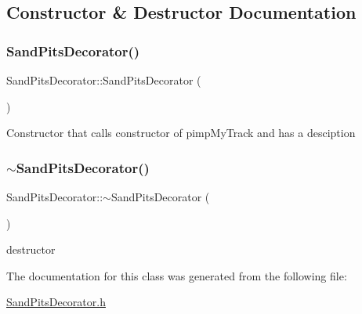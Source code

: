 \subsection{Constructor \& Destructor Documentation}
\mbox{\label{class_sand_pits_decorator_ad4c404c58c44df9c10429f7d76672855}} 
\subsubsection{\texorpdfstring{Sand\+Pits\+Decorator()}{SandPitsDecorator()}}
{\footnotesize\ttfamily Sand\+Pits\+Decorator\+::\+Sand\+Pits\+Decorator (\begin{DoxyParamCaption}{ }\end{DoxyParamCaption})\hspace{0.3cm}{\ttfamily [inline]}}

Constructor that calls constructor of pimp\+My\+Track and has a desciption \mbox{\label{class_sand_pits_decorator_a7b4b725536eaeb7412cb8e12ef0e1dc3}} 
\subsubsection{\texorpdfstring{$\sim$\+Sand\+Pits\+Decorator()}{~SandPitsDecorator()}}
{\footnotesize\ttfamily Sand\+Pits\+Decorator\+::$\sim$\+Sand\+Pits\+Decorator (\begin{DoxyParamCaption}{ }\end{DoxyParamCaption})\hspace{0.3cm}{\ttfamily [inline]}}

destructor 

The documentation for this class was generated from the following file\+:\begin{DoxyCompactItemize}
\item 
\mbox{\hyperlink{_sand_pits_decorator_8h}{Sand\+Pits\+Decorator.\+h}}\end{DoxyCompactItemize}
